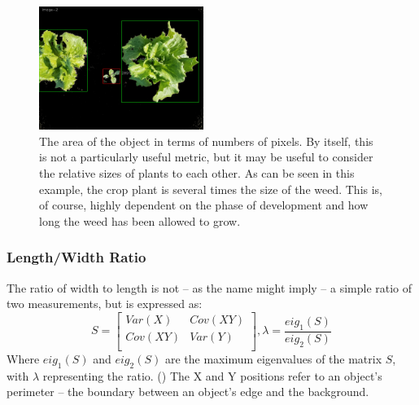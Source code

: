 \documentclass[letterpaper]{article}
\begin{document}
{{%
\begin{figure}[h!]
	\centering
	\includegraphics[height=4cm]{./figures/shape-area.jpg}
	\caption[Shape attribute: Area]{The area of the object in terms of numbers of pixels. By itself, this is not a particularly useful metric, but it may be useful to consider the relative sizes of plants to each other. As can be seen in this example, the crop plant is several times the size of the weed. This is, of course, highly dependent on the phase of development and how long the weed has been allowed to grow.}
	\label{fig:shape-area}
\end{figure}

\subsubsection{Length/Width Ratio}
\label{sec:width-length-ratio}
The ratio of width to length is not -- as the name might imply -- a simple ratio of two measurements, but is expressed as:
\begin{equation}
S = 
	\begin{bmatrix}
	Var(X) & Cov(XY) \\[0.3em]
	Cov(XY) & Var(Y) \\[0.3em]
	\end{bmatrix},
\lambda = \frac {eig_{1}(S)} {eig_{2}(S)}
\end{equation}
Where $eig_{1}(S)$ and $eig_{2}(S)$ are the maximum eigenvalues of the matrix $S$, with $\lambda$ representing the ratio. (\cite{Lin2017-xq}) The X and Y positions refer to an object's perimeter -- the boundary between an object's edge and the background.


}}
\end{document}
